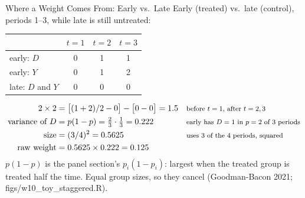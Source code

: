 \documentclass[aspectratio=169,11pt,xcolor=dvipsnames]{beamer}
\newcommand{\srcp}[1]{{\scriptsize\color{gray}(#1)}}
\begin{document}
\begin{frame}{Where a Weight Comes From: Early vs.\ Late}
Early (treated) vs.\ late (control), periods 1--3, while late is still untreated:
\vskip3pt
\begin{center}\small
\renewcommand{\arraystretch}{1.15}
\begin{tabular}{@{}lccc@{}}
\toprule
 & $t=1$ & $t=2$ & $t=3$ \\
\midrule
early: $D$ & 0 & 1 & 1 \\
early: $Y$ & 0 & 1 & 2 \\
late: $D$ and $Y$ & 0 & 0 & 0 \\
\bottomrule
\end{tabular}
\end{center}
\vskip-2pt
\begin{align*}
  2\times2 &= \big[(1+2)/2 - 0\big] - \big[0 - 0\big] = 1.5
   && \text{\footnotesize before $t = 1$, after $t = 2, 3$} \\
  \text{variance of } D &= p(1-p) = \tfrac23 \cdot \tfrac13 = 0.222
   && \text{\footnotesize early has $D = 1$ in $p = 2$ of 3 periods} \\
  \text{size} &= (3/4)^2 = 0.5625
   && \text{\footnotesize uses 3 of the 4 periods, squared} \\
  \text{raw weight} &= 0.5625 \times 0.222 = 0.125
\end{align*}
\vskip-2pt
{\small $p(1-p)$ is the panel section's $p_i(1-p_i)$: largest when the treated group is treated half
the time. Equal group sizes, so they cancel \srcp{Goodman-Bacon 2021; figs/w10\_toy\_staggered.R}.}
\end{frame}
\end{document}
